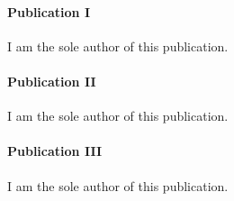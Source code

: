 
\paragraph{Publication I}
I am the sole author of this publication.

\paragraph{Publication II}
I am the sole author of this publication.

\paragraph{Publication III}
I am the sole author of this publication.
